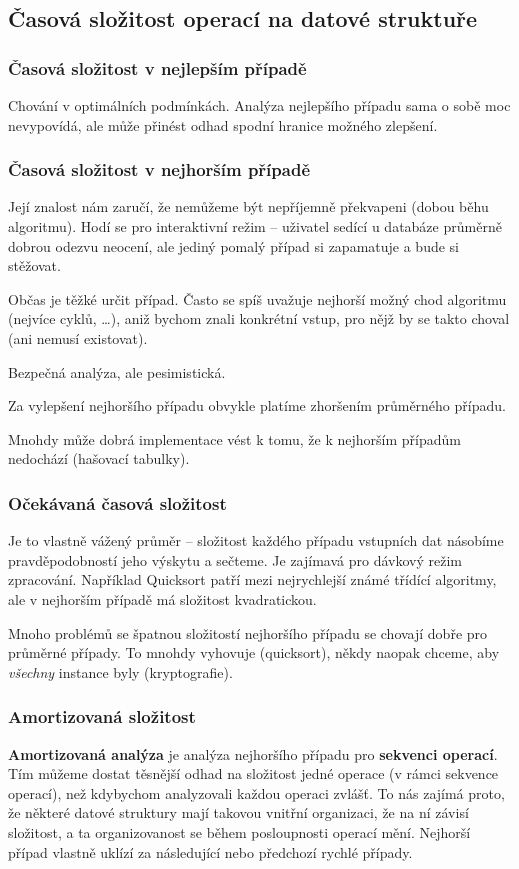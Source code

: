 \documentclass[11pt]{report} %
\numberwithin{equation}{section}
\begin{document}
\subsection{Časová složitost operací na datové struktuře}
\subsubsection{Časová složitost v nejlepším případě}
Chování v optimálních podmínkách. Analýza nejlepšího případu sama o sobě moc nevypovídá, ale může přinést odhad spodní hranice možného zlepšení.

\subsubsection{Časová složitost v nejhorším případě}
Její znalost nám zaručí, že nemůžeme být nepříjemně překvapeni (dobou běhu algoritmu). Hodí se
pro interaktivní režim -- uživatel sedící u databáze průměrně dobrou odezvu neocení, ale jediný
pomalý případ si zapamatuje a bude si stěžovat. 

Občas je těžké určit  případ. Často se spíš uvažuje nejhorší možný chod algoritmu (nejvíce cyklů, \dots), aniž bychom znali konkrétní vstup, pro nějž by se takto choval (ani nemusí existovat). 

Bezpečná analýza, ale pesimistická. 

Za vylepšení nejhoršího případu obvykle platíme zhoršením průměrného případu.

Mnohdy může dobrá implementace vést k tomu, že k nejhorším případům nedochází (hašovací tabulky).

\subsubsection{Očekávaná časová složitost}
Je to vlastně vážený průměr -- složitost každého případu vstupních dat násobíme pravděpodobností
jeho výskytu a sečteme. Je zajímavá pro dávkový režim zpracování. Například Quicksort patří mezi
nejrychlejší známé třídící algoritmy, ale v nejhorším případě má složitost kvadratickou.


Mnoho problémů se špatnou složitostí nejhoršího případu se chovají dobře pro průměrné případy. To mnohdy vyhovuje (quicksort), někdy naopak chceme, aby \textit{všechny} instance byly  (kryptografie).  


\subsubsection{Amortizovaná složitost}
\textbf{Amortizovaná analýza} je analýza nejhoršího případu pro \textbf{sekvenci operací}. Tím můžeme dostat těsnější odhad na složitost jedné operace (v rámci sekvence operací), než kdybychom analyzovali každou operaci zvlášť. To nás zajímá proto, že některé datové struktury mají takovou vnitřní organizaci, že na ní závisí složitost, a ta organizovanost se během posloupnosti operací mění. Nejhorší případ vlastně uklízí za následující nebo předchozí rychlé případy.
\end{document}
